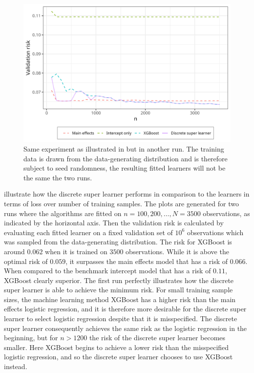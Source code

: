 \documentclass[./main.tex]{subfiles}
\begin{document}
\begin{figure}[H]
    \centering
    \includegraphics[width=\textwidth]{figures/dsl_loss_jumps.png}
    \caption{Same experiment as illustrated in  but in another run. The training data is drawn from the data-generating distribution and is therefore subject to seed randomness, the resulting fitted learners will not be the same the two runs.}
    \label{fig:loss_jumps}
\end{figure}
 illustrate how the discrete super learner performs in comparison to the learners in terms of loss over number of training samples. The plots are generated for two runs where the algorithms are fitted on $ n = 100, 200, \dots , N = 3500 $ observations, as indicated by the horizontal axis. Then the validation risk is calculated by evaluating each fitted learner on a fixed validation set of $ 10^{6} $ observations which was sampled from the data-generating distribution.  
The risk for XGBoost is around $ 0.062 $ when it is trained on $ 3500 $ observations. While it is above the optimal risk of $ 0.059 $, it surpasses the main effects model that has a risk of $ 0.066 $. When compared to the benchmark intercept model that has a risk of $ 0.11 $, XGBoost clearly superior. 
The first run perfectly illustrates how the discrete super learner is able to achieve the minimum risk. For small training sample sizes, the machine learning method XGBoost has a higher risk than the main effects logistic regression, and it is therefore more desirable for the discrete super learner to select logistic regression despite that it is misspecified. The discrete super learner consequently achieves the same risk as the logistic regression in the beginning, but for $ n > 1200 $ the risk of the discrete super learner becomes smaller. Here XGBoost begins to achieve a lower risk than the misspecified logistic regression, and so the discrete super learner chooses to use XGBoost instead. 
\end{document}
